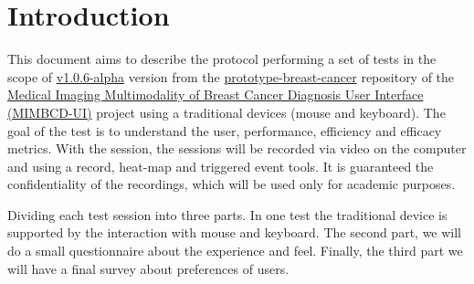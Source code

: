 \section{Introduction}

This document aims to describe the protocol performing a set of tests in the scope of \hyperlink{https://github.com/MIMBCD-UI/prototype-breast-screening/releases/tag/v1.0.6-alpha}{v1.0.6-alpha} version from the \hyperlink{https://github.com/MIMBCD-UI/prototype-breast-cancer}{prototype-breast-cancer} repository of the \hyperlink{https://mimbcd-ui.github.io/}{Medical Imaging Multimodality of Breast Cancer Diagnosis User Interface (MIMBCD-UI)} project using a traditional devices (mouse and keyboard). The goal of the test is to understand the user, performance, efficiency and efficacy metrics. With the session, the sessions will be recorded via video on the computer and using a record, heat-map and triggered event tools. It is guaranteed the confidentiality of the recordings, which will be used only for academic purposes.

Dividing each test session into three parts. In one test the traditional device is supported by the interaction with mouse and keyboard. The second part, we will do a small questionnaire about the experience and feel. Finally, the third part we will have a final survey about preferences of users.